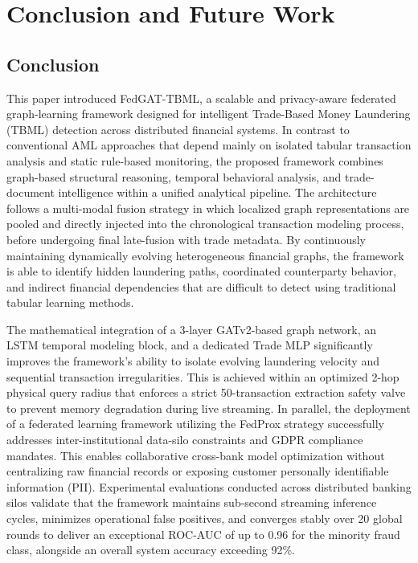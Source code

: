 \documentclass[conference]{IEEEtran}
\newcommand{\projectname}{FedGAT-TBML}
\begin{document}
\section{\textbf{Conclusion and Future Work}}

\subsection*{\textbf{Conclusion}}

This paper introduced \projectname{}, a scalable and privacy-aware federated graph-learning framework designed for intelligent Trade-Based Money Laundering (TBML) detection across distributed financial systems. In contrast to conventional AML approaches that depend mainly on isolated tabular transaction analysis and static rule-based monitoring, the proposed framework combines graph-based structural reasoning, temporal behavioral analysis, and trade-document intelligence within a unified analytical pipeline. The architecture follows a multi-modal fusion strategy in which localized graph representations are pooled and directly injected into the chronological transaction modeling process, before undergoing final late-fusion with trade metadata. By continuously maintaining dynamically evolving heterogeneous financial graphs, the framework is able to identify hidden laundering paths, coordinated counterparty behavior, and indirect financial dependencies that are difficult to detect using traditional tabular learning methods.

The mathematical integration of a 3-layer GATv2-based graph network, an LSTM temporal modeling block, and a dedicated Trade MLP significantly improves the framework's ability to isolate evolving laundering velocity and sequential transaction irregularities. This is achieved within an optimized 2-hop physical query radius that enforces a strict 50-transaction extraction safety valve to prevent memory degradation during live streaming. In parallel, the deployment of a federated learning framework utilizing the FedProx strategy successfully addresses inter-institutional data-silo constraints and GDPR compliance mandates. This enables collaborative cross-bank model optimization without centralizing raw financial records or exposing customer personally identifiable information (PII). Experimental evaluations conducted across distributed banking silos validate that the framework maintains sub-second streaming inference cycles, minimizes operational false positives, and converges stably over 20 global rounds to deliver an exceptional ROC-AUC of up to 0.96 for the minority fraud class, alongside an overall system accuracy exceeding 92\%.
\end{document}
